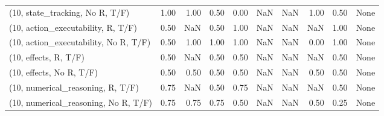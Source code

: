 \begin{table*}[h!]
\begin{adjustbox}{width=2\columnwidth,center}
\begin{tabular}{lrrr|rrr|rrr}
(10, state\_tracking, No R, T/F)       &                      1.00 &                  1.00 &                      0.50 &                          0.00 &                       NaN &                           NaN &                                   1.00 &                               0.50 &                                  None \\
(10, action\_executability, R, T/F)    &                      0.50 &                   NaN &                      0.50 &                          1.00 &                       NaN &                           NaN &                                    NaN &                               1.00 &                                  None \\
(10, action\_executability, No R, T/F) &                      0.50 &                  1.00 &                      1.00 &                          1.00 &                       NaN &                           NaN &                                   0.00 &                               1.00 &                                  None \\
(10, effects, R, T/F)                 &                      0.50 &                   NaN &                      0.50 &                          0.50 &                       NaN &                           NaN &                                    NaN &                               0.50 &                                  None \\
(10, effects, No R, T/F)              &                      0.50 &                  0.50 &                      0.50 &                          0.50 &                       NaN &                           NaN &                                   0.50 &                               0.50 &                                  None \\
(10, numerical\_reasoning, R, T/F)     &                      0.75 &                   NaN &                      0.50 &                          0.75 &                       NaN &                           NaN &                                    NaN &                               0.50 &                                  None \\
(10, numerical\_reasoning, No R, T/F)  &                      0.75 &                  0.75 &                      0.75 &                          0.50 &                       NaN &                           NaN &                                   0.50 &                               0.25 &                                  None \\

\end{tabular}
\end{adjustbox}
\end{table*}
